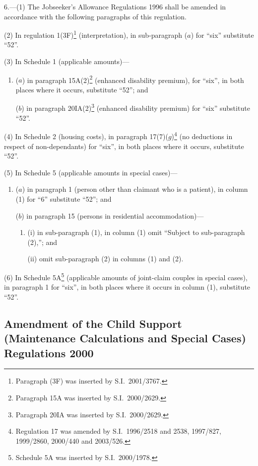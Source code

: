 \documentclass[12pt,a4paper]{article}
\begin{document}
6.---(1)  The Jobseeker’s Allowance Regulations 1996 shall be amended in accordance with the following paragraphs of this regulation.

(2) In regulation 1(3F)\footnote{Paragraph (3F) was inserted by S.I.\ 2001/3767.} (interpretation), in sub-paragraph ($a$)  for “six” substitute “52”.

(3) In Schedule 1 (applicable amounts)—
\begin{enumerate}\item[]
($a$) in paragraph 15A(2)\footnote{Paragraph 15A was inserted by S.I.\ 2000/2629.} (enhanced disability premium), for “six”, in both places where it occurs, substitute “52”; and

($b$) in paragraph 20IA(2)\footnote{Paragraph 20IA was inserted by S.I.\ 2000/2629.} (enhanced disability premium) for “six” substitute “52”.
\end{enumerate}

(4) In Schedule 2 (housing costs), in paragraph 17(7)($g$)\footnote{Regulation 17 was amended by S.I.\ 1996/2518 and 2538, 1997/827, 1999/2860, 2000/440 and 2003/526.} (no deductions in respect of non-dependants) for “six”, in both places where it occurs, substitute “52”.

(5) In Schedule 5 (applicable amounts in special cases)—
\begin{enumerate}\item[]
($a$) in paragraph 1 (person other than claimant who is a patient), in column (1) for “6” substitute “52”; and

($b$) in paragraph 15 (persons in residential accommodation)—
\begin{enumerate}\item[]
(i) in sub-paragraph (1), in column (1) omit “Subject to sub-paragraph (2),”; and

(ii) omit sub-paragraph (2) in columns (1) and (2).
\end{enumerate}
\end{enumerate}

(6) In Schedule 5A\footnote{Schedule 5A was inserted by S.I.\ 2000/1978.} (applicable amounts of joint-claim couples in special cases), in paragraph 1 for “six”, in both places where it occurs in column (1), substitute “52”.

\subsection[7. Amendment of the Child Support (Maintenance Calculations and Special Cases) Regulations 2000]{Amendment of the Child Support (Maintenance Calculations and Special Cases) Regulations 2000}
\end{document}
